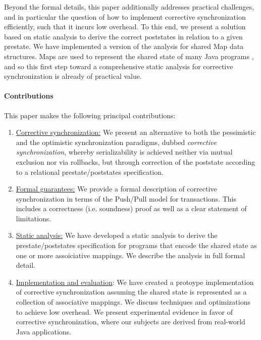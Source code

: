 Beyond the formal details, this paper additionally addresses practical challenges, and in particular the question of how to implement corrective synchronization efficiently, such that it incurs low overhead. To this end, we present a solution based on static analysis to derive the correct poststates in relation to a given prestate. We have implemented a version of the analysis for shared {\sf Map} data structures. {\sf Map}s are used to represent the shared state of many Java programs \cite{OhadOOPSLA}, and so this first step toward a comprehensive static analysis for corrective synchronization is already of practical value.


\paragraph{Contributions} This paper makes the following principal contributions:
\begin{enumerate}
	\item \underline{Corrective synchronization:} We present an alternative to both the pessimistic and the optimistic synchronization paradigms, dubbed \emph{corrective synchronization}, whereby serializability is achieved neither via mutual exclusion nor via rollbacks, but through correction of the poststate according to a relational prestate/poststates specification.
	\item \underline{Formal guarantees:} We provide a formal description of corrective synchronization in terms of the Push/Pull model for transactions. This includes a correctness (i.e. soundness) proof as well as a clear statement of limitations.
	\item \underline{Static analysis:} We have developed a static analysis to derive the prestate/poststates specification for programs that encode the shared state as one or more assoiciative mappings. We describe the analysis in full formal detail.
	\item \underline{Implementation and evaluation}: We have created a protoype implementation of corrective synchronization assuming the shared state is represented as a collection of associative mappings. We discuss techniques and optimizations to achieve low overhead. We present experimental evidence in favor of corrective synchronization, where our subjects are derived from real-world Java applications.
\end{enumerate}